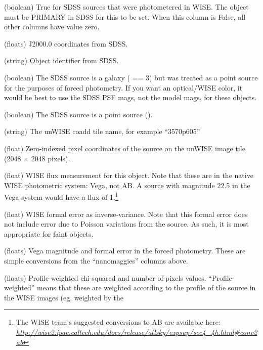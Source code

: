\documentclass[12pt,preprint]{aastex}
\newcommand{\niceurl}[1]{\href{#1}{\textsl{#1}}}
\begin{document}
\begin{description}
\itemsep1pt  
\item[\colname{has\_wise\_phot}] (boolean) True for SDSS sources that
  were photometered in WISE.  The object must be PRIMARY in SDSS for
  this to be set.  When this column is False, all other columns have
  value zero.
\item[\colname{ra}, \colname{dec}] (floats) J2000.0 coordinates from
  SDSS.
\item[\colname{objid}] (string) Object identifier from SDSS.
\item[\colname{treated\_as\_pointsource}] (boolean) The SDSS source is
  a galaxy ( == 3) but was treated as a point
  source for the purposes of forced photometry.  If you want an
  optical/WISE color, it would be best to use the SDSS PSF mags, not
  the model mags, for these objects.
\item[\colname{pointsource}] (boolean) The SDSS source is a point
  source ().
\item[\colname{coadd\_id}] (string) The unWISE coadd tile name, for
  example ``3570p605''
\item[\colname{x}, \colname{y}] (float) Zero-indexed pixel coordinates
  of the source on the unWISE image tile (2048 $\times$ 2048 pixels).
\item[\colname{w1\_nanomaggies}] (float) WISE flux measurement for
  this object.  Note that these are in the native WISE photometric
  system: Vega, not AB.  A source with magnitude 22.5 in the Vega
  system would have a  flux of 1.\footnote{
    The WISE team's suggested conversions to AB are available here:
    \niceurl{http://wise2.ipac.caltech.edu/docs/release/allsky/expsup/sec4\_4h.html\#conv2ab}}
\item[\colname{w1\_nanomaggies\_ivar}] (float) WISE formal error as
  inverse-variance.  Note that this formal error does not include
  error due to Poisson variations from the source.  As such, it is
  most appropriate for faint objects.
\item[\colname{w1\_mag}, \colname{w1\_mag\_err}] (floats) Vega
  magnitude and formal error in the forced photometry.  These are
  simple conversions from the ``nanomaggies'' columns above.
\item[\colname{w1\_prochi2}, \colname{w1\_pronpix}] (floats)
  Profile-weighted chi-squared and number-of-pixels values.
  ``Profile-weighted'' means that these are weighted according to the
  profile of the source in the WISE images (eg, weighted by the

\end{description}
\end{document}
